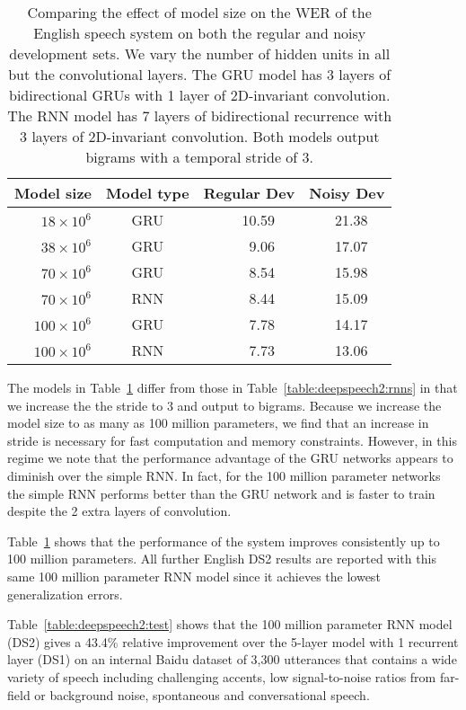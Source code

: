 \begin{table}
\centering
\begin{tabular}{r  c  r r r  r r r}
\toprule
Model size & Model type & \multicolumn{3}{c}{Regular Dev} & \multicolumn{3}{c}{Noisy Dev} \\
\midrule
$18  \times 10^6$    & GRU &   & 10.59 & &  & 21.38 & \\
$38  \times 10^6$    & GRU &   & 9.06  & &  & 17.07 & \\
$70  \times 10^6$    & GRU &   & 8.54  & &  & 15.98 & \\
$70  \times 10^6$    & RNN &   & 8.44  & &  & 15.09 & \\
$100 \times 10^6$    & GRU &   & 7.78  & &  & 14.17 & \\
$100 \times 10^6$    & RNN &   & 7.73  & &  & 13.06 & \\
\bottomrule
\end{tabular}
\caption{Comparing the effect of model size on the WER of the English speech
    system on both the regular and noisy development sets. We vary the number
    of hidden units in all but the convolutional layers. The GRU model has 3
    layers of bidirectional GRUs with 1 layer of 2D-invariant convolution. The
    RNN model has 7 layers of bidirectional recurrence with 3 layers of
    2D-invariant convolution. Both models output bigrams with a temporal stride
    of 3.}
\label{table:deepspeech2:modelsize}
\end{table}

The models in Table~\ref{table:deepspeech2:modelsize} differ from those in
Table~\ref{table:deepspeech2:rnns} in that we increase the the stride to 3 and
output to bigrams. Because we increase the model size to as many as 100 million
parameters, we find that an increase in stride is necessary for fast
computation and memory constraints. However, in this regime we note that the
performance advantage of the GRU networks appears to diminish over the simple
RNN. In fact, for the 100 million parameter networks the simple RNN performs
better than the GRU network and is faster to train despite the 2 extra layers
of convolution.

Table~\ref{table:deepspeech2:modelsize} shows that the performance of the
system improves consistently up to 100 million parameters. All further English
DS2 results are reported with this same 100 million parameter RNN model since
it achieves the lowest generalization errors.

Table~\ref{table:deepspeech2:test} shows that the 100 million parameter RNN
model (DS2) gives a 43.4\% relative improvement over the 5-layer model with 1
recurrent layer (DS1) on an internal Baidu dataset of 3,300 utterances that
contains a wide variety of speech including challenging accents, low
signal-to-noise ratios from far-field or background noise, spontaneous and
conversational speech. 


